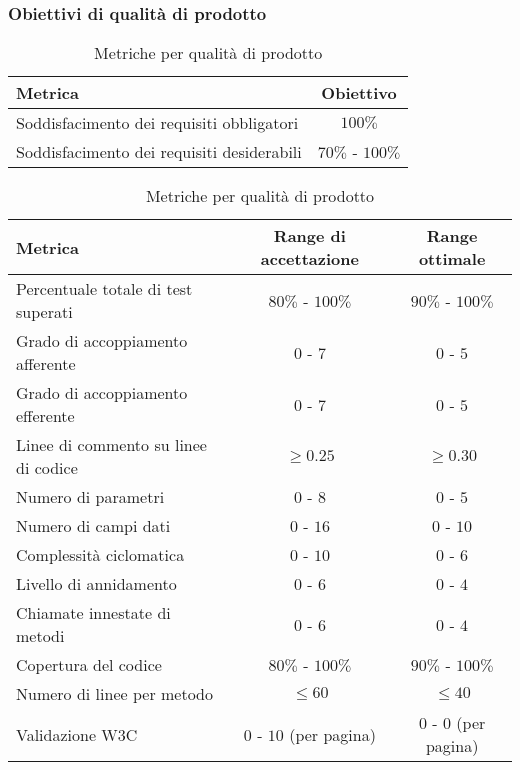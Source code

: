 \documentclass[../PianoDiQualifica.tex]{subfiles}
\begin{document}
			\subsubsection{Obiettivi di qualità di prodotto}\label{sez:MetrichePerQualitaDiProdotto}
				\begin{table}[H]
				\center
					\begin{tabular}{|l|c|}
						\hline
						\rowcolor{blue!30}\textbf{Metrica} & \textbf{Obiettivo} \\ \hline
						Soddisfacimento dei requisiti obbligatori & $100\%$\\ \hline
						Soddisfacimento dei requisiti desiderabili & $70\%$ - $100\%$\\ \hline
					\end{tabular}
					\begin{tabular}{|l|c|c|}
						\hline
						\rowcolor{blue!30}\textbf{Metrica} & \textbf{Range di accettazione} & \textbf{Range ottimale}\\ \hline
						Percentuale totale di test superati & $80\%$ - $100\%$ & $90\%$ - $100\%$ \\ \hline
						Grado di accoppiamento afferente & $0$ - $7$ & $0$ - $5$ \\ \hline
						Grado di accoppiamento efferente & $0$ - $7$ & $0$ - $5$ \\ \hline
						Linee di commento su linee di codice & $\geq 0.25$ & $\geq 0.30$ \\ \hline
						Numero di parametri & $0$ - $8$ & $0$ - $5$  \\ \hline
						Numero di campi dati & $0$ - $16$ & $0$ - $10$ \\ \hline
						Complessità ciclomatica & $0$ - $10$ & $0$ - $6$  \\ \hline
						Livello di annidamento & $0$ - $6$ & $0$ - $4$ \\ \hline
						Chiamate innestate di metodi & $0$ - $6$ & $0$ - $4$ \\ \hline
						Copertura del codice & $80\%$ - $100\%$ & $90\%$ - $100\%$ \\ \hline
						Numero di linee per metodo & $\leq 60$ & $\leq 40$ \\ \hline
						Validazione W3C & $0$ - $10$ (per pagina) & $0$ - $0$ (per pagina) \\ \hline
					\end{tabular}
					\caption{Metriche per qualità di prodotto}
				\end{table}
\end{document}
